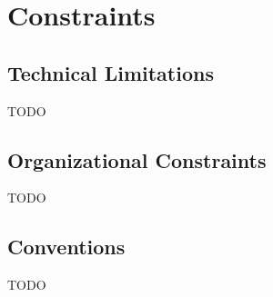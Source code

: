 \section{Constraints}

\subsection{Technical Limitations}
TODO
\subsection{Organizational Constraints}
TODO
\subsection{Conventions}
TODO